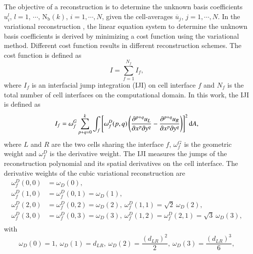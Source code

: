 The objective of a reconstruction is to determine the unknown basis coefficients $u_i^l$,  $l=1$, $\cdots$, $\mathrm{N_b}\left(k\right)$, $i=1,\cdots,N$, given the cell-averages $\overline{u}_j$, $j=1,\cdots,N$. In the variational reconstruction \cite{wang2017compact_VR}, the linear equation system to determine the unknown basis coefficients is derived by minimizing a cost function using the variational method. Different cost function results in different reconstruction schemes. The cost function is defined as
\begin{equation}
    \label{eq:cost-function}
    I = \sum^{N_f}_{f=1} {I_f},
\end{equation}
where $I_f$ is an interfacial jump integration (IJI) on cell interface $f$ and $N_f$ is the total number of cell interfaces on the computational domain.
In this work, the IJI is defined as
\begin{equation}
    \label{eq:IJI}
    I_f = \omega_f^G \sum_{p+q=0}^{k} \int_{f}{
        \left[
            \omega_f^D(p,q)
            \left(
            \partialderivative{^{p+q}u_L}{x^p\partial y^q}
            -
            \partialderivative{^{p+q}u_R}{x^p\partial y^q}
            \right)
            \right]^2
        \dd A
    },
\end{equation}
where $L$ and $R$ are the two cells sharing the interface $f$, $\omega_f^G$ is the geometric weight and
$\omega_f^D$ is the derivative weight. The IJI measures the jumps of the reconstruction polynomial and its spatial derivatives on the cell interface.
The derivative weights of the cubic variational reconstruction are
\begin{equation}
    \begin{aligned}
        \omega_f^D(0,0) & = \omega_D(0),                                                                               \\
        \omega_f^D(1,0) & = \omega_f^D(0,1) = \omega_D(1) ,                                                            \\
        \omega_f^D(2,0) & = \omega_f^D(0,2) = \omega_D(2),\ \omega_f^D(1,1) = \sqrt{2}\ \omega_D(2)  ,                 \\
        \omega_f^D(3,0) & = \omega_f^D(0,3) = \omega_D(3),\ \omega_f^D(1,2) = \omega_f^D(2,1) = \sqrt{3}\ \omega_D(3), \\
    \end{aligned}
    \label{eq:wdRotRatio}
\end{equation}
with
\begin{equation}
    \omega_D(0) = 1, \ \omega_D(1) = d_{LR}, \ \omega_D(2) = \frac{\left(d_{LR}\right)^2}{2}, \ \omega_D(3) = \frac{\left(d_{LR}\right)^3}{6},
    \label{eq:wdHQMOPT}
\end{equation}
